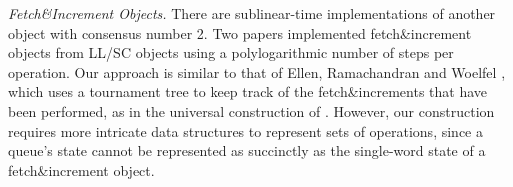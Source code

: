 \emph{Fetch\&Increment Objects.}
There are sublinear-time implementations of another object
with consensus number 2.
Two papers \cite{ERW12,10.1007/978-3-642-41527-2_20}
implemented fetch\&increment objects from LL/SC objects
using a polylogarithmic number of steps per operation.
Our approach is similar to that of Ellen, Ramachandran and Woelfel \cite{ERW12},
which uses a tournament tree to keep track of the fetch\&increments
that have been performed, as in the universal construction of \cite{DBLP:conf/stoc/AfekDT95}.
However, our construction requires more intricate
data structures to represent sets of operations, since a queue's state cannot be represented as succinctly
as the single-word state of a fetch\&increment object.

